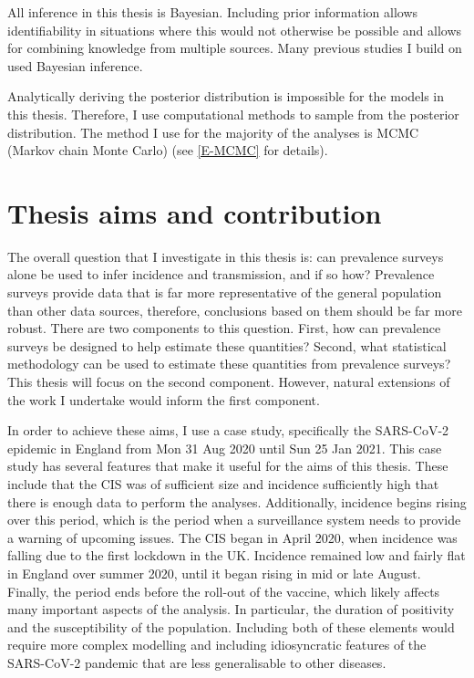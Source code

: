 \documentclass[thesis.tex]{subfiles}
\begin{document}
All inference in this thesis is Bayesian.
Including prior information allows identifiability in situations where this would not otherwise be possible and allows for combining knowledge from multiple sources.
Many previous studies I build on used Bayesian inference.

Analytically deriving the posterior distribution is impossible for the models in this thesis.
Therefore, I use computational methods to sample from the posterior distribution.
The method I use for the majority of the analyses is MCMC (Markov chain Monte Carlo) (see \cref{E-MCMC} for details).

\section{Thesis aims and contribution} \label{intro:sec:aims}

The overall question that I investigate in this thesis is: can prevalence surveys alone be used to infer incidence and transmission, and if so how?
Prevalence surveys provide data that is far more representative of the general population than other data sources, therefore, conclusions based on them should be far more robust.
There are two components to this question.
First, how can prevalence surveys be designed to help estimate these quantities?
Second, what statistical methodology can be used to estimate these quantities from prevalence surveys?
This thesis will focus on the second component.
However, natural extensions of the work I undertake would inform the first component.

In order to achieve these aims, I use a case study, specifically the SARS-CoV-2 epidemic in England from Mon 31 Aug 2020 until Sun 25 Jan 2021.
This case study has several features that make it useful for the aims of this thesis.
These include that the CIS was of sufficient size and incidence sufficiently high that there is enough data to perform the analyses.
Additionally, incidence begins rising over this period, which is the period when a surveillance system needs to provide a warning of upcoming issues.
The CIS began in April 2020, when incidence was falling due to the first lockdown in the UK.
Incidence remained low and fairly flat in England over summer 2020, until it began rising in mid or late August.
Finally, the period ends before the roll-out of the vaccine, which likely affects many important aspects of the analysis.
In particular, the duration of positivity and the susceptibility of the population.
Including both of these elements would require more complex modelling and including idiosyncratic features of the SARS-CoV-2 pandemic that are less generalisable to other diseases.
\end{document}
